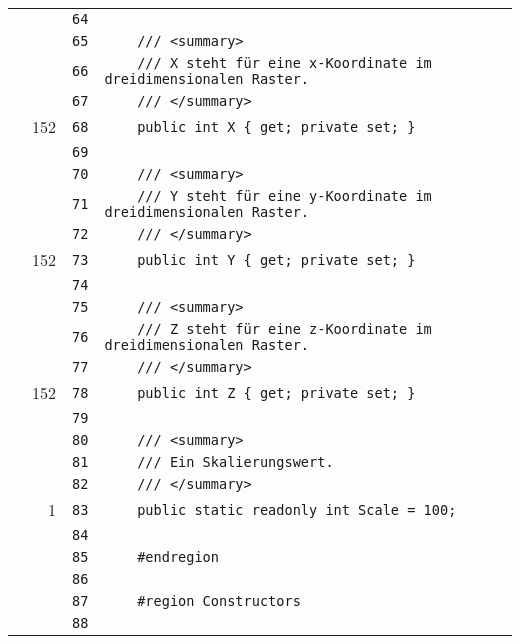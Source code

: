 \documentclass[a4paper,10pt]{article}
\begin{document}
\begin{longtable}[l]{lrrl}
\cellcolor{gray} &  & \verb~64~ & \verb~~\\
\cellcolor{gray} &  & \verb~65~ & \verb~    /// <summary>~\\
\cellcolor{gray} &  & \verb~66~ & \verb~    /// X steht für eine x-Koordinate im dreidimensionalen Raster.~\\
\cellcolor{gray} &  & \verb~67~ & \verb~    /// </summary>~\\
\cellcolor{green} & 152 & \verb~68~ & \verb~    public int X { get; private set; }~\\
\cellcolor{gray} &  & \verb~69~ & \verb~~\\
\cellcolor{gray} &  & \verb~70~ & \verb~    /// <summary>~\\
\cellcolor{gray} &  & \verb~71~ & \verb~    /// Y steht für eine y-Koordinate im dreidimensionalen Raster.~\\
\cellcolor{gray} &  & \verb~72~ & \verb~    /// </summary>~\\
\cellcolor{green} & 152 & \verb~73~ & \verb~    public int Y { get; private set; }~\\
\cellcolor{gray} &  & \verb~74~ & \verb~~\\
\cellcolor{gray} &  & \verb~75~ & \verb~    /// <summary>~\\
\cellcolor{gray} &  & \verb~76~ & \verb~    /// Z steht für eine z-Koordinate im dreidimensionalen Raster.~\\
\cellcolor{gray} &  & \verb~77~ & \verb~    /// </summary>~\\
\cellcolor{green} & 152 & \verb~78~ & \verb~    public int Z { get; private set; }~\\
\cellcolor{gray} &  & \verb~79~ & \verb~~\\
\cellcolor{gray} &  & \verb~80~ & \verb~    /// <summary>~\\
\cellcolor{gray} &  & \verb~81~ & \verb~    /// Ein Skalierungswert.~\\
\cellcolor{gray} &  & \verb~82~ & \verb~    /// </summary>~\\
\cellcolor{green} & 1 & \verb~83~ & \verb~    public static readonly int Scale = 100;~\\
\cellcolor{gray} &  & \verb~84~ & \verb~~\\
\cellcolor{gray} &  & \verb~85~ & \verb~    #endregion~\\
\cellcolor{gray} &  & \verb~86~ & \verb~~\\
\cellcolor{gray} &  & \verb~87~ & \verb~    #region Constructors~\\
\cellcolor{gray} &  & \verb~88~ & \verb~~\\

\end{longtable}
\end{document}
